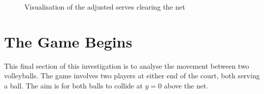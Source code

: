 \documentclass{article}
\begin{document}
\begin{figure}[H]
														\caption{Visualisation of the adjusted serves clearing the net}
													\end{figure}


													\section*{The Game Begins}
													This final section of this investigation is to analyse the movement between two volleyballs. The game involves two players at either end of the court, both serving a ball. The aim is for both balls to collide at \(y=0\) above the net.
\end{document}
